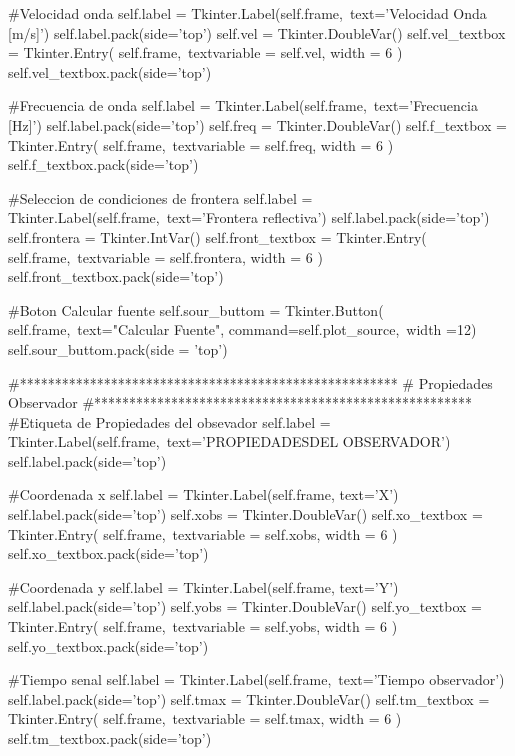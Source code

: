 \begin{listing}[style=python]
    #Velocidad onda
    self.label = Tkinter.Label(self.frame,\
    text='Velocidad Onda [m/s]')
    self.label.pack(side='top') 
    self.vel = Tkinter.DoubleVar()
    self.vel_textbox = Tkinter.Entry( self.frame,\
    textvariable = self.vel, width = 6 )
    self.vel_textbox.pack(side='top')

    #Frecuencia de onda
    self.label = Tkinter.Label(self.frame,\
    text='Frecuencia [Hz]')
    self.label.pack(side='top') 
    self.freq = Tkinter.DoubleVar()
    self.f_textbox = Tkinter.Entry( self.frame,\
    textvariable = self.freq, width = 6 )
    self.f_textbox.pack(side='top')
    
    #Seleccion de condiciones de frontera
    self.label = Tkinter.Label(self.frame,\
    text='Frontera reflectiva\n[0 -- no\t1 -- si]')
    self.label.pack(side='top')  
    self.frontera = Tkinter.IntVar()
    self.front_textbox = Tkinter.Entry( self.frame,\
    textvariable = self.frontera, width = 6 )
    self.front_textbox.pack(side='top')
    
    #Boton Calcular fuente
    self.sour_buttom = Tkinter.Button( self.frame,\
    text="Calcular Fuente", command=self.plot_source,\
    width =12)
    self.sour_buttom.pack(side = 'top')
        
        
    #******************************************************
    #	Propiedades Observador
    #******************************************************
    #Etiqueta de Propiedades del obsevador
    self.label = Tkinter.Label(self.frame,\
    text='PROPIEDADES\n DEL OBSERVADOR')
    self.label.pack(side='top')
    
    #Coordenada x
    self.label = Tkinter.Label(self.frame, text='X')
    self.label.pack(side='top') 
    self.xobs = Tkinter.DoubleVar()
    self.xo_textbox = Tkinter.Entry( self.frame,\
    textvariable = self.xobs, width = 6 )
    self.xo_textbox.pack(side='top')
    
    #Coordenada y
    self.label = Tkinter.Label(self.frame, text='Y')
    self.label.pack(side='top') 
    self.yobs = Tkinter.DoubleVar()
    self.yo_textbox = Tkinter.Entry( self.frame,\
    textvariable = self.yobs, width = 6 )
    self.yo_textbox.pack(side='top')
    
    #Tiempo senal
    self.label = Tkinter.Label(self.frame,\
    text='Tiempo observador')
    self.label.pack(side='top') 
    self.tmax = Tkinter.DoubleVar()
    self.tm_textbox = Tkinter.Entry( self.frame,\
    textvariable = self.tmax, width = 6 )
    self.tm_textbox.pack(side='top')
    

\end{listing}
